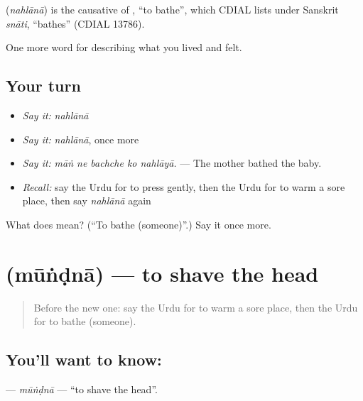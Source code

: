 \begin{cousinweb}
\textbf{} (\emph{nahlānā}) is the causative of \textbf{}, \textquotedblleft{}to bathe\textquotedblright{}, which CDIAL lists under Sanskrit \emph{snāti}, \textquotedblleft{}bathes\textquotedblright{} (CDIAL 13786).
\end{cousinweb}

\begin{grammarlens}[title={What you've built}]
One more word for describing what you lived and felt.
\end{grammarlens}

\subsection*{Your turn}
\begin{itemize}
\raggedright
  \item \emph{Say it:} \emph{nahlānā}
  \item \emph{Say it:} \emph{nahlānā}, once more
  \item \emph{Say it:} \emph{māṅ ne bachche ko nahlāyā.} — The mother bathed the baby.
  \item \emph{Recall:} say the Urdu for to press gently, then the Urdu for to warm a sore place, then say \emph{nahlānā} again
\end{itemize}

\begin{tcolorbox}[breakable,colback=teal!4,colframe=teal!35!black,title={Before you move on}]
What does  mean? (\textquotedblleft{}To bathe (someone)\textquotedblright{}.) Say it once more.
\end{tcolorbox}
\section[\texorpdfstring{\ur{مونڈنا} (mūṅḍnā)}{مونڈنا (mūṅḍnā)}]{ (mūṅḍnā) — to shave the head}

\label{lesson:UR-C482-mundna}



\begin{quote}
Before the new one: say the Urdu for to warm a sore place, then the Urdu for to bathe (someone).
\end{quote}

\subsection*{You'll want to know: }
\textbf{} — \emph{mūṅḍnā} — \textquotedblleft{}to shave the head\textquotedblright{}.


